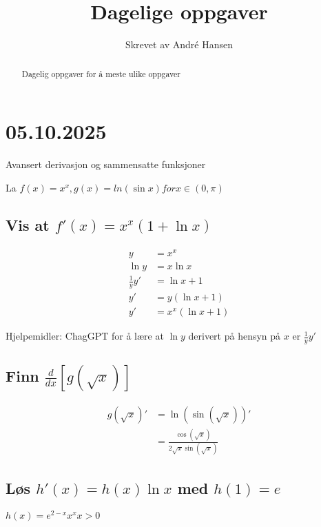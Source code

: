 \documentclass{article}
\title{Dagelige oppgaver}
\author{Skrevet av André Hansen}
\begin{document}
\maketitle

\begin{abstract}
Dagelig oppgaver for å meste ulike oppgaver
\end{abstract}

\section{05.10.2025}

Avansert derivasjon og sammensatte funksjoner

La $f(x)=x^x, g(x)=ln(\sin x) for x\in(0,\pi)$

\subsection{Vis at $f'(x)=x^x(1+\ln x)$}

\begin{align*}
    y &= x^x \\
    \ln y &= x\ln x \\
    \frac{1}{y} y' &= \ln x + 1 \\
    y' &= y(\ln x + 1) \\
    y'&= x^x(\ln x + 1)
\end{align*}

Hjelpemidler: ChagGPT for å lære at $\ln y$ derivert på hensyn på $x$ er $\frac{1}{y}y'$

\subsection{Finn $\frac{d}{dx}[g(\sqrt{x})]$}

\begin{align*}
    g(\sqrt{x})' &= \ln(\sin(\sqrt{x}))' \\
    &= \frac{\cos(\sqrt{x})}{2 \sqrt{x} \sin(\sqrt{x})}
\end{align*}

\subsection{Løs $h'(x)=h(x)\ln x$ med $h(1)=e$}

$h(x)=e^{2-x}x^x x>0$
\end{document}
